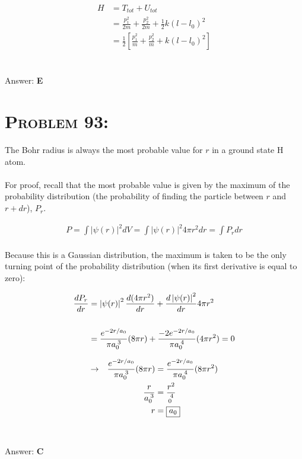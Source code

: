 \documentclass{article}
\begin{document}
\begin{align}
H &= T_{tot} + U_{tot} \\
&= \frac{p_{1}^{2}}{2m} + \frac{p_{2}^{2}}{2m} + \frac{1}{2} k (l-l_{0})^{2}\nonumber\\
&=\frac{1}{2}\left[ \frac{p_{1}^{2}}{m} + \frac{p_{2}^{2}}{m} +k (l-l_{0})^{2}  \right]\nonumber
\end{align}
\\\\
Answer: \textbf{\textcolor{ProcessBlue}E}\\


\section{\textsc{Problem 93:}} The Bohr radius is always the most probable value for $r$ in a ground state H atom. \\
\\
For proof, recall that the most probable value is given by the maximum of the probability distribution (the probability of finding the particle between $r$ and $r + dr$), $P_{r}$.

\begin{gather}
P = \int{\left|  \psi(r) \right|^{2}}dV = \int{\left|  \psi(r) \right|^{2}} 4 \pi r^{2}dr = \int{P_{r}}dr
\end{gather}
\\
Because this is a Gaussian distribution, the maximum is taken to be the only turning point of the probability distribution (when its first derivative is equal to zero):

\begin{align}
\frac{dP_{r}}{dr} &= \left|  \psi(r) \right|^{2} \frac{d(4 \pi r^{2})}{dr} + \frac{d\left|  \psi(r) \right|^{2}}{dr} 4 \pi r^{2}\nonumber\\
 \nonumber\\
&= \frac{e^{-2r/a_{0}}}{\pi a_{0}^{\hspace{.03in} 3}} (8 \pi r) + \frac{-2 e^{-2r/a_{0}}}{\pi a_{0}^{\hspace{.03in} 4}} (4 \pi r^{2})  = 0\nonumber
\end{align}

\begin{align}
\rightarrow \hspace{.1in} \frac{e^{-2r/a_{0}}}{\pi a_{0}^{\hspace{.03in} 3}} (8 \pi r) &= \frac{e^{-2r/a_{0}}}{\pi a_{0}^{\hspace{.03in} 4}} (8 \pi r^{2}) \nonumber\\
\frac{r}{a_{0}^{\hspace{.03in} 3}} &= \frac{r^{2}}{_{0}^{\hspace{.03in} 4}}\nonumber\\
r &= \boxed{a_{0}}\nonumber
\end{align}
\\\\
Answer: \textbf{\textcolor{ProcessBlue}C}\\
\end{document}
